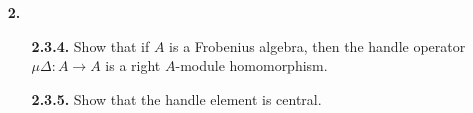 \documentclass[ 12pt ]{article}
\begin{document}
\begin{enumerate}
\begin{proof}
			Conversely, let $V \in \mathsf{Vect}_\mathbb{k}$ be dualizable; that is, we have a vector space $W \in \mathsf{Vect}_\mathbb{k}$, a pairing $\beta : V \otimes W \to \mathbb{k}$ and copairing $\gamma : \mathbb{k} \to W \otimes V$. By definition we have that $$\mathrm{id}_V = \beta \otimes \mathrm{id}_V \cdot \mathrm{id}_V \otimes \gamma.$$ If $\gamma(1) = \sum_{i=1}^n w_i \otimes v_i$ where $\{ w_i \}$ and $\{ v_i \}$ are, respectively, basis elements of $W$ and $V$, and $v \in V$ is an arbitrary vector, it follows that $$v = \mathrm{id}_V v = (\beta \otimes \mathrm{id}_V \cdot \mathrm{id}_V \otimes \gamma) v = \sum_{i=1}^n \beta(v \otimes w_i) v_i.$$ Since $\beta(v \otimes w_i) \in \mathbb{k}$ is a coefficient, we have that every $v \in V$ is in the span of $\{ v_i \}_{i \in [n]}$ and so $V$ is finite dimensional.
		\end{proof}


	\item[\textbf{2.}] $ $
		\begin{enumerate}
			\item[\textbf{2.3.4.}] Show that if $A$ is a Frobenius algebra, then the handle operator $\mu \Delta : A \to A$ is a right $A$-module homomorphism.
			\item[\textbf{2.3.5.}] Show that the handle element is central.
		\end{enumerate}


\end{enumerate}
\end{document}
